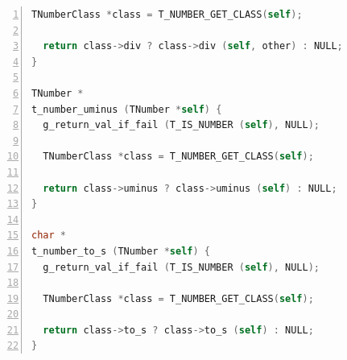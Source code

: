 \begin{lstlisting}[language=C, numbers=left]
  TNumberClass *class = T_NUMBER_GET_CLASS(self);

  return class->div ? class->div (self, other) : NULL;
}

TNumber *
t_number_uminus (TNumber *self) {
  g_return_val_if_fail (T_IS_NUMBER (self), NULL);

  TNumberClass *class = T_NUMBER_GET_CLASS(self);

  return class->uminus ? class->uminus (self) : NULL;
}

char *
t_number_to_s (TNumber *self) {
  g_return_val_if_fail (T_IS_NUMBER (self), NULL);

  TNumberClass *class = T_NUMBER_GET_CLASS(self);

  return class->to_s ? class->to_s (self) : NULL;
}
\end{lstlisting}

